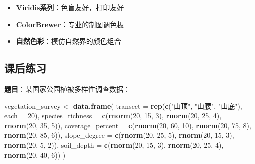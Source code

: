 \documentclass[
]{book}
\newenvironment{Shaded}{\begin{snugshade}}{\end{snugshade}}
\newcommand{\AttributeTok}[1]{\textcolor[rgb]{0.13,0.29,0.53}{#1}}
\newcommand{\DecValTok}[1]{\textcolor[rgb]{0.00,0.00,0.81}{#1}}
\newcommand{\FunctionTok}[1]{\textcolor[rgb]{0.13,0.29,0.53}{\textbf{#1}}}
\newcommand{\NormalTok}[1]{#1}
\newcommand{\OtherTok}[1]{\textcolor[rgb]{0.56,0.35,0.01}{#1}}
\newcommand{\StringTok}[1]{\textcolor[rgb]{0.31,0.60,0.02}{#1}}
\providecommand{\tightlist}{%
  \setlength{\itemsep}{0pt}\setlength{\parskip}{0pt}}
\begin{document}
\begin{itemize}
\tightlist
\item
  \textbf{Viridis系列}：色盲友好，打印友好
\item
  \textbf{ColorBrewer}：专业的制图调色板
\item
  \textbf{自然色彩}：模仿自然界的颜色组合
\end{itemize}

\hypertarget{ux8bfeux540eux7ec3ux4e60-9}{%
\subsection{课后练习}\label{ux8bfeux540eux7ec3ux4e60-9}}

\textbf{题目}：某国家公园植被多样性调查数据：

\begin{Shaded}
\begin{Highlighting}[]
\NormalTok{vegetation\_survey }\OtherTok{\textless{}{-}} \FunctionTok{data.frame}\NormalTok{(}
  \AttributeTok{transect =} \FunctionTok{rep}\NormalTok{(}\FunctionTok{c}\NormalTok{(}\StringTok{"山顶"}\NormalTok{, }\StringTok{"山腰"}\NormalTok{, }\StringTok{"山底"}\NormalTok{), }\AttributeTok{each =} \DecValTok{20}\NormalTok{),}
  \AttributeTok{species\_richness =} \FunctionTok{c}\NormalTok{(}\FunctionTok{rnorm}\NormalTok{(}\DecValTok{20}\NormalTok{, }\DecValTok{15}\NormalTok{, }\DecValTok{3}\NormalTok{), }\FunctionTok{rnorm}\NormalTok{(}\DecValTok{20}\NormalTok{, }\DecValTok{25}\NormalTok{, }\DecValTok{4}\NormalTok{), }\FunctionTok{rnorm}\NormalTok{(}\DecValTok{20}\NormalTok{, }\DecValTok{35}\NormalTok{, }\DecValTok{5}\NormalTok{)),}
  \AttributeTok{coverage\_percent =} \FunctionTok{c}\NormalTok{(}\FunctionTok{rnorm}\NormalTok{(}\DecValTok{20}\NormalTok{, }\DecValTok{60}\NormalTok{, }\DecValTok{10}\NormalTok{), }\FunctionTok{rnorm}\NormalTok{(}\DecValTok{20}\NormalTok{, }\DecValTok{75}\NormalTok{, }\DecValTok{8}\NormalTok{), }\FunctionTok{rnorm}\NormalTok{(}\DecValTok{20}\NormalTok{, }\DecValTok{85}\NormalTok{, }\DecValTok{6}\NormalTok{)),}
  \AttributeTok{slope\_degree =} \FunctionTok{c}\NormalTok{(}\FunctionTok{rnorm}\NormalTok{(}\DecValTok{20}\NormalTok{, }\DecValTok{25}\NormalTok{, }\DecValTok{5}\NormalTok{), }\FunctionTok{rnorm}\NormalTok{(}\DecValTok{20}\NormalTok{, }\DecValTok{15}\NormalTok{, }\DecValTok{3}\NormalTok{), }\FunctionTok{rnorm}\NormalTok{(}\DecValTok{20}\NormalTok{, }\DecValTok{5}\NormalTok{, }\DecValTok{2}\NormalTok{)),}
  \AttributeTok{soil\_depth =} \FunctionTok{c}\NormalTok{(}\FunctionTok{rnorm}\NormalTok{(}\DecValTok{20}\NormalTok{, }\DecValTok{15}\NormalTok{, }\DecValTok{3}\NormalTok{), }\FunctionTok{rnorm}\NormalTok{(}\DecValTok{20}\NormalTok{, }\DecValTok{25}\NormalTok{, }\DecValTok{4}\NormalTok{), }\FunctionTok{rnorm}\NormalTok{(}\DecValTok{20}\NormalTok{, }\DecValTok{40}\NormalTok{, }\DecValTok{6}\NormalTok{))}
\NormalTok{)}
\end{Highlighting}
\end{Shaded}
\end{document}
